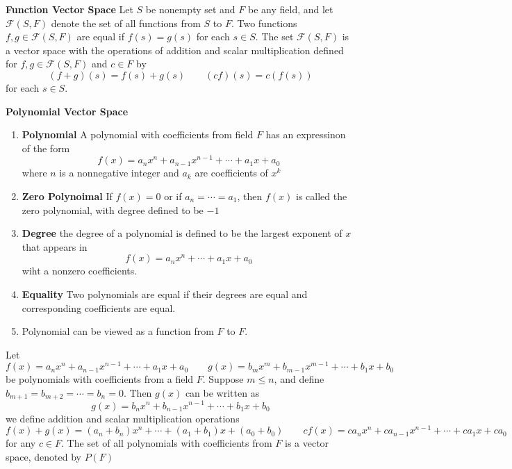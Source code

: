 \documentclass[11pt]{article}
\begin{document}
\begin{defn*}
    \textbf{Function Vector Space} Let $S$ be nonempty set and $F$ be any field, and let $\mathcal{F}(S,F)$ denote the set of all functions from $S$ to $F$. Two functions $f,g\in \mathcal{F}(S,F)$ are equal if $f(s)=g(s)$ for each $s\in S$. The set $\mathcal{F}(S,F)$ is a vector space with the operations of addition and scalar multiplication defined for $f,g\in \mathcal{F}(S,F)$ and $c\in F$ by 
    \[
        (f+g)(s) = f(s)+g(s)
        \quad \quad 
        (cf)(s) = c(f(s))    
    \]
    for each $s\in S$.
\end{defn*}


\begin{defn*}
    \textbf{Polynomial Vector Space}
    \begin{enumerate}
        \item \textbf{Polynomial} A polynomial with coefficients from field $F$ has an expressinon of the form 
        \[
            f(x)=  a_n x^n + a_{n-1}x^{n-1} + \cdots + a_1 x + a_0    
        \]
        where $n$ is a nonnegative integer and $a_k$ are coefficients of $x^k$
        \item \textbf{Zero Polynoimal} If $f(x)=0$ or if $a_n = \cdots = a_1$, then $f(x)$ is called the zero polynomial, with degree defined to be $-1$
        \item \textbf{Degree} the degree of a polynomial is defined to be the largest exponent of $x$ that appears in 
        \[
            f(x) = a_n x^n + \cdots + a_1 x  +a_0    
        \]
        wiht a nonzero coefficients. 
        \item \textbf{Equality} Two polynomials are equal if their degrees are equal and corresponding coefficients are equal. 
        \item Polynomial can be viewed as a function from $F$ to $F$. 
    \end{enumerate}
    Let 
    \[
        f(x) = a_nx^n + a_{n-1}x^{n-1} + \cdots + a_1 x + a_0
        \quad \quad 
        g(x) = b_m x^m + b_{m-1}x^{m-1} + \cdots + b_1 x + b_0    
    \]
    be polynomials with coefficients from a field $F$. Suppose $m\leq n$, and define $b_{m+1} = b_{m+2} = \cdots = b_n = 0$. Then $g(x)$ can be written as 
    \[
        g(x) = b_n x^n + b_{n-1}x^{n-1} + \cdots + b_1 x + b_0    
    \]
    we define addition and scalar multiplication operations 
    \[
        f(x) + g(x) = (a_n + b_n)x^n + \cdots + (a_1 + b_1)x + (a_0 + b_0)
        \quad \quad 
        cf(x) = ca_n x^n + ca_{n-1} x^{n-1} + \cdots + ca_1 x + ca_0
    \]
    for any $c\in F$. The set of all polynomials with coefficients from $F$ is a vector space, denoted by $P(F)$ 
\end{defn*}
\end{document}
